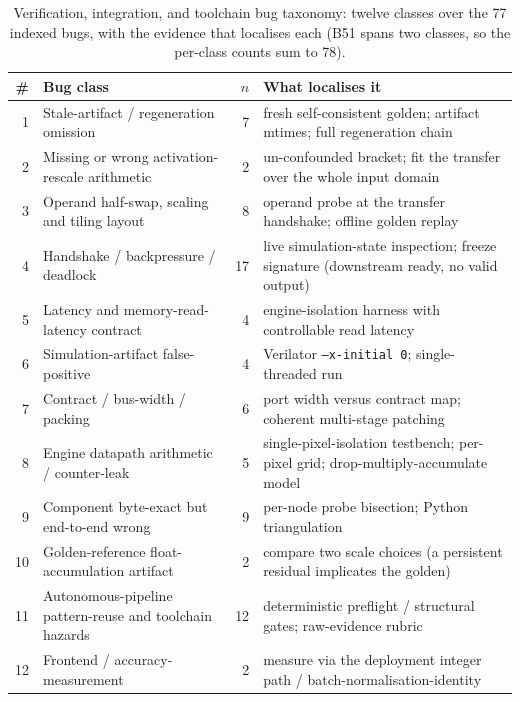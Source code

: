 \begin{table}[t]
\centering
\caption{Verification, integration, and toolchain bug taxonomy: twelve classes over the 77 indexed bugs, with the evidence that localises each (B51 spans two classes, so the per-class counts sum to 78).}
\label{tab:taxonomy}
\footnotesize
\begin{tabular}{@{}r p{} r p{}@{}}
\toprule
\# & Bug class & $n$ & What localises it \\
\midrule
1 & Stale-artifact / regeneration omission & 7 & fresh self-consistent golden; artifact mtimes; full regeneration chain \\
2 & Missing or wrong activation-rescale arithmetic & 2 & un-confounded bracket; fit the transfer over the whole input domain \\
3 & Operand half-swap, scaling and tiling layout & 8 & operand probe at the transfer handshake; offline golden replay \\
4 & Handshake / backpressure / deadlock & 17 & live simulation-state inspection; freeze signature (downstream ready, no valid output) \\
5 & Latency and memory-read-latency contract & 4 & engine-isolation harness with controllable read latency \\
6 & Simulation-artifact false-positive & 4 & Verilator \texttt{--x-initial 0}; single-threaded run \\
7 & Contract / bus-width / packing & 6 & port width versus contract map; coherent multi-stage patching \\
8 & Engine datapath arithmetic / counter-leak & 5 & single-pixel-isolation testbench; per-pixel grid; drop-multiply-accumulate model \\
9 & Component byte-exact but end-to-end wrong & 9 & per-node probe bisection; Python triangulation \\
10 & Golden-reference float-accumulation artifact & 2 & compare two scale choices (a persistent residual implicates the golden) \\
11 & Autonomous-pipeline pattern-reuse and toolchain hazards & 12 & deterministic preflight / structural gates; raw-evidence rubric \\
12 & Frontend / accuracy-measurement & 2 & measure via the deployment integer path / batch-normalisation-identity \\
\bottomrule
\end{tabular}
\end{table}

